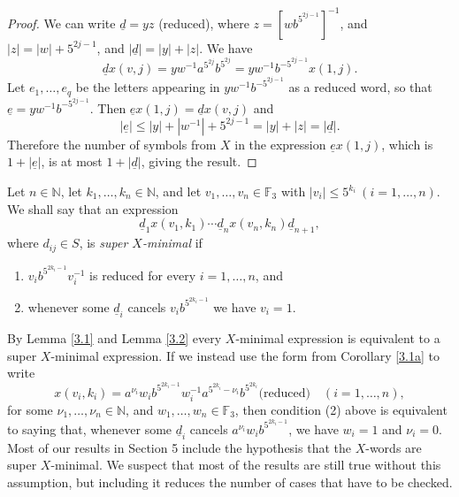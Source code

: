 \documentclass[twoside,11pt]{amsart}
\numberwithin{equation}{section}
\theoremstyle{definition}
\newcommand {\N}{\mathbb N}
\newcommand{\1}{\mathbbm{1}}
\newcommand{\F}{\mathbb F}
\newcommand{\pdt}{\underline}
\begin{document}
	
	\begin{proof}
		We can write $\pdt{d} = yz$ (reduced), where $z = [wb^{5^{2j-1}}]^{-1}$, and $|z| = |w| + 5^{2j-1}$, and $|\pdt{d}| = |y| + |z|$. We have 
		$$\pdt{d}x(v,j) = yw^{-1}a^{5^{2j}}b^{5^{2j}} = yw^{-1} b^{-5^{2j-1}} x(1,j).$$
		Let $e_1, \ldots, e_{q}$ be the letters appearing in $yw^{-1}b^{-5^{2j-1}}$ as a reduced word, so that $\pdt{e} = yw^{-1}b^{-5^{2j-1}}$.
		Then $\pdt{e}x(1,j) = \pdt{d}x(v,j)$ and
		$$|\pdt{e}| \leq |y| + |w^{-1}| + 5^{2j-1} = |y| + |z| = |\pdt{d}|.$$
		Therefore the number of symbols from $X$ in the expression $\pdt{e}x(1,j)$, which is $1+|\pdt{e}|$, is at most $1+|\pdt{d}|$, giving the result.
	\end{proof}
	
	Let $n \in \N$, let $k_1, \ldots, k_n \in \N$, and let $v_1, \ldots, v_n \in \F_3$ with $|v_i| \leq 5^{k_i} \ (i = 1, \ldots, n)$. We shall say that an expression 
	$$\pdt{d}_1 x(v_1, k_1) \cdots \pdt{d}_n x(v_n, k_n) \pdt{d}_{n+1},$$
	 where $d_{ij} \in S$, is \textit{super $X$-minimal} if
	 \begin{enumerate}
	 	\item $v_ib^{5^{2k_i-1}}v_i^{-1}$ is reduced for every $i = 1, \ldots, n$, and 
	 	\item  whenever some $\pdt{d}_i$ cancels $v_i b^{5^{2k_i-1}}$ we have $v_i = 1$.
	 \end{enumerate} By Lemma \ref{3.1} and Lemma \ref{3.2} every $X$-minimal expression is equivalent to a super $X$-minimal expression. 
	 If we instead use the form from Corollary \ref{3.1a} to write 
	 $$x(v_i, k_i) = a^{\nu_i} w_i b^{5^{2k_i - 1}} w_i^{-1} a^{5^{2k_i} - \nu_i} b^{5^{2k_i}} \text{(reduced)} \quad (i = 1, \ldots, n),$$
	 for some $\nu_1, \ldots, \nu_n \in \N$, and $w_1, \ldots, w_n \in \F_3$, then condition (2) above is equivalent to saying that, whenever some $\pdt{d}_i$ cancels $a^{\nu_i} w_i b^{5^{2k_i - 1}}$, we have $w_i = 1$ and $\nu_i = 0$. Most of our results in Section 5 include the hypothesis that the $X$-words are super $X$-minimal. We suspect that most of the results are still true without this assumption, but including it reduces the number of cases that have to be checked.
	 
	
\end{document}
